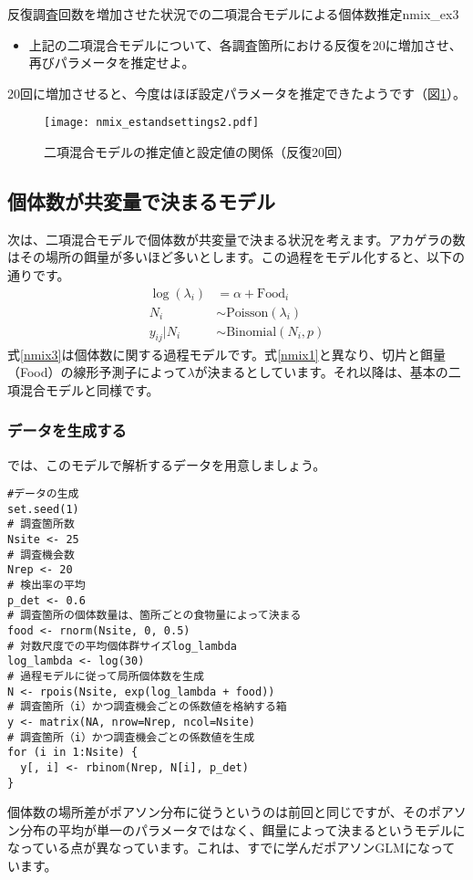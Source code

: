 \begin{exercise}{反復調査回数を増加させた状況での二項混合モデルによる個体数推定}{nmix_ex3}
\begin{itemize}
  \item 上記の二項混合モデルについて、各調査箇所における反復を20に増加させ、再びパラメータを推定せよ。
\end{itemize}
\end{exercise}

20回に増加させると、今度はほぼ設定パラメータを推定できたようです（図\ref{nmix_estandsettings2}）。
\begin{figure}[htb]
\begin{center}
\graphicspath{{4_hm/figs/}}
\texttt{[image: nmix\_estandsettings2.pdf]}\\
\caption{二項混合モデルの推定値と設定値の関係（反復20回）}
\label{nmix_estandsettings2}
\end{center}
\end{figure}

	\subsection{個体数が共変量で決まるモデル}
次は、二項混合モデルで個体数が共変量で決まる状況を考えます。アカゲラの数はその場所の餌量が多いほど多いとします。この過程をモデル化すると、以下の通りです。
\begin{align}
\log(\lambda_{i}) &= \alpha + \text{Food}_{i} \label{nmix3} \\
N_{i} &\sim \text{Poisson}(\lambda_{i}) \label{nmix4} \\
y_{ij} | N_{i} &\sim \text{Binomial}(N_{i}, p) \label{nmix5}
\end{align}
式\ref{nmix3}は個体数に関する過程モデルです。式\ref{nmix1}と異なり、切片と餌量（Food）の線形予測子によって$\lambda$が決まるとしています。それ以降は、基本の二項混合モデルと同様です。

		\subsubsection{データを生成する}
では、このモデルで解析するデータを用意しましょう。
\begin{verbatim}
#データの生成
set.seed(1)
# 調査箇所数
Nsite <- 25
# 調査機会数
Nrep <- 20
# 検出率の平均
p_det <- 0.6
# 調査箇所の個体数量は、箇所ごとの食物量によって決まる
food <- rnorm(Nsite, 0, 0.5)
# 対数尺度での平均個体群サイズlog_lambda
log_lambda <- log(30)
# 過程モデルに従って局所個体数を生成
N <- rpois(Nsite, exp(log_lambda + food))
# 調査箇所（i）かつ調査機会ごとの係数値を格納する箱
y <- matrix(NA, nrow=Nrep, ncol=Nsite)
# 調査箇所（i）かつ調査機会ごとの係数値を生成
for (i in 1:Nsite) {
  y[, i] <- rbinom(Nrep, N[i], p_det)
}
\end{verbatim}
個体数の場所差がポアソン分布に従うというのは前回と同じですが、そのポアソン分布の平均が単一のパラメータではなく、餌量によって決まるというモデルになっている点が異なっています。これは、すでに学んだポアソンGLMになっています。

